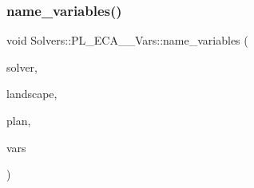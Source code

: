 \subsubsection{\texorpdfstring{name\+\_\+variables()}{name\_variables()}}
{\footnotesize\ttfamily void Solvers\+::\+P\+L\+\_\+\+E\+C\+A\+\_\+\_\+\+Vars\+::name\+\_\+variables (\begin{DoxyParamCaption}\item[{\hyperlink{class_o_s_i___builder}{O\+S\+I\+\_\+\+Builder} \&}]{solver,  }\item[{const \hyperlink{class_landscape}{Landscape} \&}]{landscape,  }\item[{const \hyperlink{class_restoration_plan}{Restoration\+Plan} \&}]{plan,  }\item[{\hyperlink{class_solvers_1_1_p_l___e_c_a__2___vars_1_1_variables}{Variables} \&}]{vars }\end{DoxyParamCaption})}

